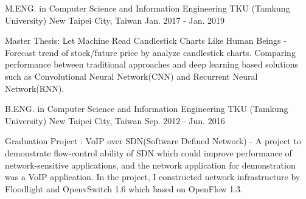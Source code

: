 

\begin{cventries}

    \cventry
        {M.ENG. in Computer Science and Information Engineering}
        {TKU (Tamkung University)}
        {New Taipei City, Taiwan}
        {Jan. 2017 - Jan. 2019}
        {
            \begin{cvitems}
                \item 
                    {
                        Master Thesis: Let Machine Read Candlestick Charts Like Human Beings - Forecast trend of stock/future price by analyze candlestick charts. Comparing performance between traditional approaches and deep learning based solutions such as Convolutional Neural Network(CNN) and Recurrent Neural Network(RNN).
                    }
            \end{cvitems}
        }

    \cventry
        {B.ENG. in Computer Science and Information Engineering}
        {TKU (Tamkung University)}
        {New Taipei City, Taiwan}
        {Sep. 2012 - Jun. 2016}
        {
            \begin{cvitems}
                \item 
                    {
                        Graduation Project : VoIP over SDN(Software Defined Network) - A project to demonstrate flow-control ability of SDN which could improve performance of network-sensitive applications, and the network application for demonstration was a VoIP application. In the project, I constructed network infrastructure by Floodlight and OpenvSwitch 1.6 which based on OpenFlow 1.3.
                    }
            \end{cvitems}
        }
    


\end{cventries}
